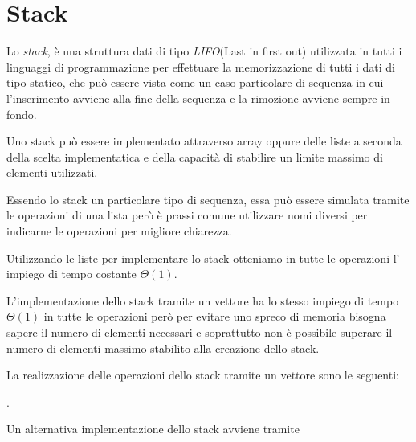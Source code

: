 \section{Stack}
Lo \emph{stack}, è una struttura dati di tipo \emph{LIFO}(Last in first out) utilizzata
in tutti i linguaggi di programmazione per effettuare la memorizzazione di tutti i dati
di tipo statico, che può essere vista come un caso particolare di sequenza in cui
l'inserimento avviene alla fine della sequenza e la rimozione avviene sempre in fondo.

Uno stack può essere implementato attraverso array oppure delle liste a seconda della
scelta implementatica e della capacità di stabilire un limite massimo di elementi utilizzati.

Essendo lo stack un particolare tipo di sequenza, essa può essere simulata tramite le operazioni di una lista
però è prassi comune utilizzare nomi diversi per indicarne le operazioni per migliore chiarezza.


Utilizzando le liste per implementare lo stack otteniamo in tutte le operazioni l'
impiego di tempo costante $\Theta(1)$.

L'implementazione dello stack tramite un vettore ha lo stesso impiego di tempo $\Theta(1)$
in tutte le operazioni però per evitare uno spreco di memoria bisogna sapere il numero
di elementi necessari e soprattutto non è possibile superare il numero di elementi massimo
stabilito alla creazione dello stack.

La realizzazione delle operazioni dello stack tramite un vettore sono le seguenti:


































































.


Un alternativa implementazione dello stack avviene tramite
